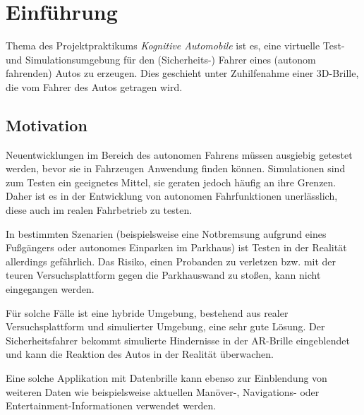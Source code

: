 
\section{Einführung}
\label{einleitung_sec}

Thema des Projektpraktikums \emph{Kognitive Automobile} ist es, eine virtuelle Test- und Simulationsumgebung für den (Sicherheits-) Fahrer eines (autonom fahrenden) Autos zu erzeugen.
Dies geschieht unter Zuhilfenahme einer 3D-Brille, die vom Fahrer des Autos getragen wird.



\subsection{Motivation}
\label{motivation_subsec}


Neuentwicklungen im Bereich des autonomen Fahrens müssen ausgiebig getestet werden, bevor sie in  Fahrzeugen Anwendung finden können.
Simulationen sind zum Testen ein geeignetes Mittel, sie geraten jedoch häufig an ihre Grenzen.
Daher ist es in der Entwicklung von autonomen Fahrfunktionen unerlässlich, diese auch im realen Fahrbetrieb zu testen.

In bestimmten Szenarien (beispielsweise eine Notbremsung aufgrund eines Fußgängers oder autonomes Einparken im Parkhaus) ist Testen in der Realität allerdings gefährlich.
Das Risiko, einen Probanden zu verletzen bzw. mit der teuren Versuchsplattform gegen die Parkhauswand zu stoßen, kann nicht eingegangen werden.

Für solche Fälle ist eine hybride Umgebung, bestehend aus realer Versuchsplattform und simulierter Umgebung, eine sehr gute Lösung.
Der Sicherheitsfahrer bekommt simulierte Hindernisse in der AR-Brille eingeblendet und kann die Reaktion des Autos in der Realität überwachen.

Eine solche Applikation mit Datenbrille kann ebenso zur Einblendung von weiteren Daten wie beispielsweise aktuellen Manöver-, Navigations- oder Entertainment-Informationen verwendet werden.




